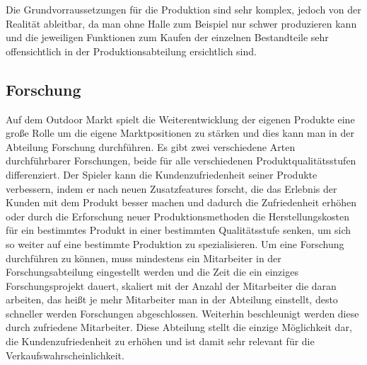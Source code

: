 Die Grundvorraussetzungen für die Produktion sind sehr komplex, jedoch von der Realität ableitbar, da man ohne Halle zum Beispiel nur schwer produzieren kann und die jeweiligen Funktionen zum Kaufen der einzelnen Bestandteile sehr offensichtlich in der Produktionsabteilung ersichtlich sind.

\subsection{Forschung}
Auf dem Outdoor Markt spielt die Weiterentwicklung der eigenen Produkte eine große Rolle um die eigene Marktpositionen zu stärken und dies kann man in der Abteilung Forschung durchführen. Es gibt zwei verschiedene Arten durchführbarer Forschungen, beide für alle verschiedenen Produktqualitätsstufen differenziert. Der Spieler kann die Kundenzufriedenheit seiner Produkte verbessern, indem er nach neuen Zusatzfeatures forscht, die das Erlebnis der Kunden mit dem Produkt besser machen und dadurch die Zufriedenheit erhöhen oder durch die Erforschung neuer Produktionsmethoden die Herstellungskosten für ein bestimmtes Produkt in einer bestimmten Qualitätsstufe senken, um sich so weiter auf eine bestimmte Produktion zu spezialisieren. Um eine Forschung durchführen zu können, muss mindestens ein Mitarbeiter in der Forschungsabteilung eingestellt werden und die Zeit die ein einziges Forschungsprojekt dauert, skaliert mit der Anzahl der Mitarbeiter die daran arbeiten, das heißt je mehr Mitarbeiter man in der Abteilung einstellt, desto schneller werden Forschungen abgeschlossen. Weiterhin beschleunigt werden diese durch zufriedene Mitarbeiter. 
Diese Abteilung stellt die einzige Möglichkeit dar, die Kundenzufriedenheit zu erhöhen und ist damit sehr relevant für die Verkaufswahrscheinlichkeit.

